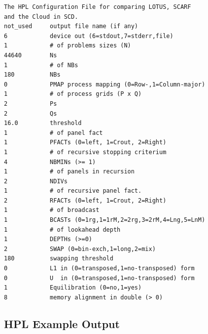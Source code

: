 \documentclass{article}
\begin{document}
        \begin{verbatim}
The HPL Configuration File for comparing LOTUS, SCARF
and the Cloud in SCD.
not_used     output file name (if any)
6            device out (6=stdout,7=stderr,file)
1            # of problems sizes (N)
44640        Ns
1            # of NBs
180          NBs
0            PMAP process mapping (0=Row-,1=Column-major)
1            # of process grids (P x Q)
2            Ps
2            Qs
16.0         threshold
1            # of panel fact
1            PFACTs (0=left, 1=Crout, 2=Right)
1            # of recursive stopping criterium
4            NBMINs (>= 1)
1            # of panels in recursion
2            NDIVs
1            # of recursive panel fact.
2            RFACTs (0=left, 1=Crout, 2=Right)
1            # of broadcast
1            BCASTs (0=1rg,1=1rM,2=2rg,3=2rM,4=Lng,5=LnM)
1            # of lookahead depth
1            DEPTHs (>=0)
2            SWAP (0=bin-exch,1=long,2=mix)
180          swapping threshold
0            L1 in (0=transposed,1=no-transposed) form
0            U  in (0=transposed,1=no-transposed) form
1            Equilibration (0=no,1=yes)
8            memory alignment in double (> 0)
        \end{verbatim}


    \subsection{HPL Example Output}
        \label{appendix:hpl-example-output}
\end{document}
